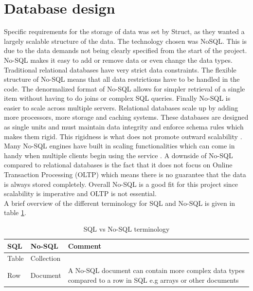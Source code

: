 \section{Database design}
Specific requirements for the storage of data was set by Struct, as they wanted a largely scalable structure of the data. The technology chosen was \gls{NoSQL}.
This is due to the data demands not being clearly specified from the start of the project. No-SQL makes it easy to add or remove data or even change the data types. Traditional relational databases have very strict data constraints. The flexible structure of No-SQL means that all data restrictions have to be handled in the code. The denormalized format of No-SQL allows for simpler retrieval of a single item without having to do joins or complex SQL queries. Finally No-SQL is easier to scale across multiple servers. Relational databases scale up by adding more processors, more storage and caching systems. These databases are designed as single units and must maintain data integrity and enforce schema rules which makes them rigid. This rigidness is what does not promote outward scalability \cite{NoSQLScalability}.  Many No-SQL engines have built in scaling functionalities which can come in handy when multiple clients begin using the service \cite{SQLvsNOSQL}. A downside of No-SQL compared to relational databases is the fact that it does not focus on Online Transaction Processing (OLTP) which means there is no guarantee that the data is always stored completely. Overall No-SQL is a good fit for this project since scalability is imperative and OLTP is not essential.\\
A brief overview of the different terminology for SQL and No-SQL is given in table \ref{sqlvsnosql_table}.
\begin{table}[H]
	\centering
	\caption{SQL vs No-SQL terminology}
	\label{sqlvsnosql_table}
	\begin{tabular}{|l|l|p{8cm}|}
		\hline
		\textbf{SQL}   & \textbf{No-SQL}     & \textbf{Comment}                                                                                                    \\ \hline
		Table & Collection &                                                                                                            \\ \hline
		Row   & Document   & A No-SQL document can contain more complex data types compared to a row in SQL e.g arrays or other documents \\
		\hline
	\end{tabular}
\end{table}


